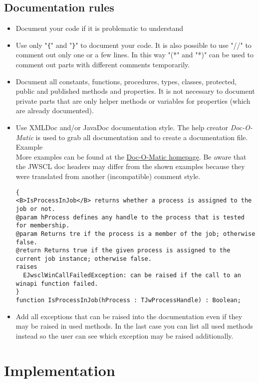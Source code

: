 \documentclass[a4paper,twoside,10pt]{report}
\begin{document}
\subsection{Documentation rules}
\begin{itemize}
	\item Document your code if it is problematic to understand
	\item Use only "\verb#{#" and "\verb#}#" to document your code. It is also possible to use "//" to comment out only one or a few lines. In this way "(*" and "*)" can be used to comment out parts with different comments temporarily.
	\item Document all constants, functions, procedures, types, classes, protected, public and published methods and properties. It is not necessary to document private parts that are only helper methods or variables for properties (which are already documented).
	\item Use XMLDoc and/or JavaDoc documentation style. The help creator \textit{Doc-O-Matic} is used to grab all documentation and to create a documentation file.
Example\\ 
More examples can be found at the \href{http://www.doc-o-matic.com/examplesourcecode.html}{Doc-O-Matic homepage}.
Be aware that the JWSCL doc headers may differ from the shown examples because they were translated from another (incompatible) comment style.
\begin{lstlisting}  
{
<B>IsProcessInJob</B> returns whether a process is assigned to the job or not.
@param hProcess defines any handle to the process that is tested for membership.
@param Returns tre if the process is a member of the job; otherwise false.
@return Returns true if the given process is assigned to the current job instance; otherwise false.
raises
  EJwsclWinCallFailedException: can be raised if the call to an winapi function failed.
}
function IsProcessInJob(hProcess : TJwProcessHandle) : Boolean;
\end{lstlisting}

\item Add all exceptions that can be raised into the documentation even if they may be raised in used methods. In the last case you can list all used methods instead so the user can see which exception may be raised additionally.

\end{itemize}

\section{Implementation}
\end{document}
